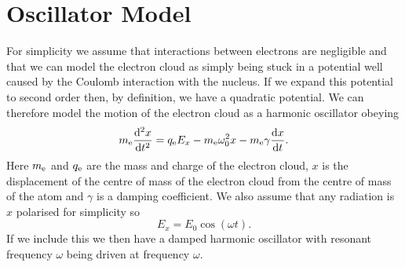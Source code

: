     \section{Oscillator Model}
    For simplicity we assume that interactions between electrons are negligible and that we can model the electron cloud as simply being stuck in a potential well caused by the Coulomb interaction with the nucleus.
    If we expand this potential to second order then, by definition, we have a quadratic potential.
    We can therefore model the motion of the electron cloud as a harmonic oscillator obeying
    \[m_{\mathrm{e}} \dv[2]{x}{t} = q_{\mathrm{e}} E_x - m_{\mathrm{e}}\omega_0^2x - m_{\mathrm{e}}\gamma \dv{x}{t}.\]
    Here \(m_{\mathrm{e}}\) and \(q_{\mathrm{e}}\) are the mass and charge of the electron cloud, \(x\) is the displacement of the centre of mass of the electron cloud from the centre of mass of the atom and \(\gamma\) is a damping coefficient.
    We also assume that any radiation is \(x\) polarised for simplicity so
    \[E_x = E_0\cos(\omega t).\]
    If we include this we then have a damped harmonic oscillator with resonant frequency \(\omega\) being driven at frequency \(\omega\).
    

